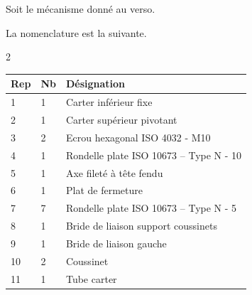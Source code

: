 \normalfalse \difficiletrue \tdifficilefalse
\correctionfalse

\setcounter{question}{0}%

\ifcorrection
\else
{}
\fi

\ifprof
\else
Soit le mécanisme donné au verso.
\fi


\ifprof
\else
La nomenclature est la suivante. 
\begin{multicols}{2}
\begin{marginfigure}
\begin{tabular}{|l|l|l|}
\hline
Rep & Nb  & Désignation \\ \hline \hline %
1 & 1 & Carter inférieur fixe  \\ \hline %
2&
1&
Carter supérieur pivotant\\ \hline %
3&
2 &
Ecrou hexagonal ISO 4032 - M10 \\ \hline %
4&
1&
Rondelle plate ISO 10673 – Type N - 10 \\ \hline %
5&
1&
Axe fileté à tête fendu \\ \hline %
6&
1&
Plat de fermeture%
\\ \hline %
7&
7&
Rondelle plate ISO 10673 -- Type N - 5 \\ \hline %
8&
1&
Bride de liaison support coussinets \\ \hline %
9&
1&
Bride de liaison gauche \\ \hline %
10&
2&
Coussinet \\ \hline %
11&
1&
Tube carter \\ \hline %

\end{tabular}
\end{marginfigure}
\end{multicols}
